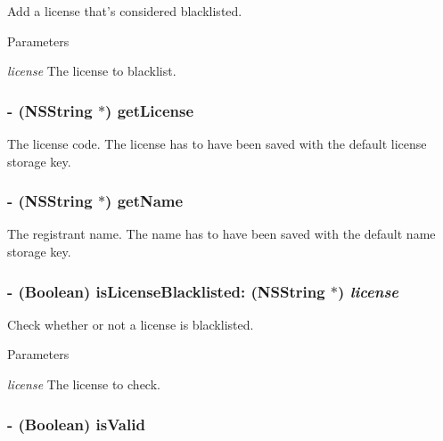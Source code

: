 Add a license that's considered blacklisted. 
\begin{DoxyParams}{Parameters}
\item[{\em license}]The license to blacklist. \end{DoxyParams}
\hypertarget{interface_g_d_registration_ad8830b56a002a550f28c095233078aba}{
\subsubsection[{getLicense}]{\setlength{\rightskip}{0pt plus 5cm}-\/ (NSString $\ast$) getLicense }}
\label{interface_g_d_registration_ad8830b56a002a550f28c095233078aba}


The license code. The license has to have been saved with the default license storage key. \hypertarget{interface_g_d_registration_a748a7113b6adcf0337c820aa56bb01ed}{
\subsubsection[{getName}]{\setlength{\rightskip}{0pt plus 5cm}-\/ (NSString $\ast$) getName }}
\label{interface_g_d_registration_a748a7113b6adcf0337c820aa56bb01ed}


The registrant name. The name has to have been saved with the default name storage key. \hypertarget{interface_g_d_registration_a4b3b036fb9260a31cc1eca5bb436d27e}{
\subsubsection[{isLicenseBlacklisted:}]{\setlength{\rightskip}{0pt plus 5cm}-\/ (Boolean) isLicenseBlacklisted: (NSString $\ast$) {\em license}}}
\label{interface_g_d_registration_a4b3b036fb9260a31cc1eca5bb436d27e}


Check whether or not a license is blacklisted. 
\begin{DoxyParams}{Parameters}
\item[{\em license}]The license to check. \end{DoxyParams}
\hypertarget{interface_g_d_registration_a172ffae07aff61343bf35bd93d50d9f2}{
\subsubsection[{isValid}]{\setlength{\rightskip}{0pt plus 5cm}-\/ (Boolean) isValid }}
\label{interface_g_d_registration_a172ffae07aff61343bf35bd93d50d9f2}


